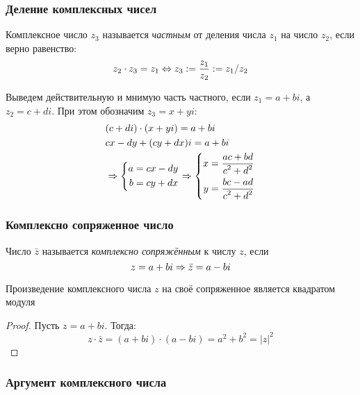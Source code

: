 \subsubsection*{Деление комплексных чисел}

\begin{definition}
    Комплексное число $z_3$ называется \textit{частным} от деления числа $z_1$ на число $z_2$, если верно равенство:
    $$
        z_2 \cdot z_3 = z_1 \Leftrightarrow z_3 := \frac{z_1}{z_2} := z_1 / z_2
    $$
\end{definition}

\begin{corollary}
    Выведем действительную и мнимую часть частного, если $z_1 = a + bi$, а $z_2 = c + di$. При этом обозначим $z_3 = x + yi$:
    \begin{align*}
        &(c + di) \cdot (x + yi) = a + bi
        \\
        &cx - dy + (cy + dx)i = a + bi
        \\
        &\Rightarrow \left\{\begin{aligned}a = cx - dy \\ b = cy + dx\end{aligned}\right.
        \Rightarrow \left\{\begin{aligned}x = \frac{\displaystyle ac + bd}{\displaystyle c^2 + d^2} \\ y = \frac{\displaystyle bc - ad}{\displaystyle c^2 + d^2}\end{aligned}\right.
    \end{align*}
\end{corollary}

\subsubsection*{Комплексно сопряженное число}

\begin{definition}
    Число $\bar{z}$ называется \textit{комплексно сопряжённым} к числу $z$, если
    $$
        z = a + bi \Rightarrow \bar{z} = a - bi
    $$
\end{definition}

\begin{proposition}
    Произведение комплексного числа $z$ на своё сопряженное является квадратом модуля
\end{proposition}

\begin{proof}
    Пусть $z = a + bi$. Тогда:
    $$
        z \cdot \bar{z} = (a + bi) \cdot (a - bi) = a^2 + b^2 = |z|^2
    $$
\end{proof}

\subsubsection*{Аргумент комплексного числа}

